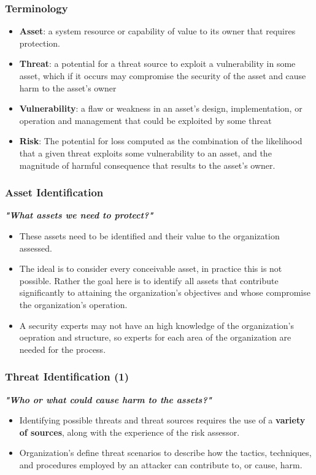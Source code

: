 \documentclass[xcolor ={table,usenames,dvipsnames}]{beamer}
\theoremstyle{definition}
\begin{document}
	\begin{frame}
		\frametitle{Terminology}
			\begin{itemize}
				\item \textbf{Asset}: a system resource or capability of value to its owner that requires protection. 
				\item \textbf{Threat}: a potential for a threat source to exploit a vulnerability in some asset, which if it occurs may compromise the security of the asset and cause harm to the asset’s owner
				\item \textbf{Vulnerability}: a flaw or weakness in an asset’s design, implementation, or operation and management that could be exploited 		by some threat
				\item \textbf{Risk}: The potential for loss computed as the 	combination of the likelihood that a given threat exploits some vulnerability to an asset, and the magnitude of harmful consequence that results to the asset’s owner.
			\end{itemize}
	\end{frame}

	\begin{frame}
		\frametitle{Asset Identification}
		\textit{\textbf{"What assets we need to protect?"}}
		\begin{itemize}
			\item These assets need to be identified and their value to the organization assessed.
			\item The ideal is to consider every conceivable asset, in practice this is not possible. Rather the goal here is to identify all assets that contribute significantly to attaining the organization’s objectives and whose compromise the organization’s operation. 
			\item A security experts may not have an high knowledge of the organization's oepration and structure, so experts for each area of the organization are needed for the process.
		\end{itemize}
	\end{frame}

	\begin{frame}
		\frametitle{Threat Identification (1)}
		\textbf{\textit{"Who or what could cause harm to the assets?"}}
		\begin{itemize}
			\item Identifying possible threats and threat sources requires the use of a \textbf{variety of sources}, along with the experience of the risk assessor. 
			\item  Organization’s define threat scenarios to describe how the tactics, techniques, and procedures employed by an attacker can contribute to, or cause, harm. 
		\end{itemize}
		
		
	\end{frame}
\end{document}
